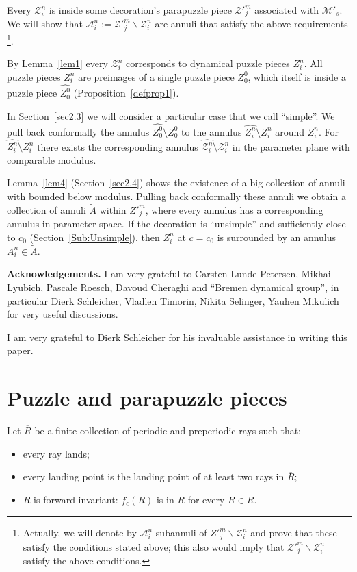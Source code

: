 \documentclass[12pt,a4paper]{amsart}
\newcommand{\MM}{\mathcal M}
\renewcommand{\AA}{\mathcal A}
\newcommand{\ZZ}{\mathcal Z}
\newcommand{\ovl}{\overline}
\begin{document}
  Every $\ZZ^n_i$ is inside some decoration's
  parapuzzle piece $\ZZ'^m_j$ associated with $\MM'_s$.
  We will show that
  $\AA^n_i:=\ZZ'^m_j\backslash \ZZ^n_i$ are annuli that satisfy the
above requirements%
\footnote{Actually, we will denote by $\AA^n_i$ subannuli of
$Z'^m_j\backslash \ZZ^n_i$ and prove that these satisfy the
conditions stated above; this also would imply that
$\ZZ'^m_j\backslash \ZZ^n_i$ satisfy the above conditions.}.


  By Lemma~\ref{lem1} every $\ZZ^n_i$ corresponds to
   dynamical puzzle pieces $Z^n_i$.
   All puzzle pieces $Z^n_i$ are preimages of a single puzzle piece
 $Z^0_0$, which itself is inside a puzzle piece $\widehat{Z^0_0}$ (Proposition~\ref{defprop1}).

In Section~\ref{sec2.3} we will consider a particular case that we
call ``simple''. We pull back conformally the annulus
$\widehat{Z^0_0}\setminus Z^0_0$ to the annulus
$\widehat{Z^n_i}\setminus Z^n_i$ around $Z^n_i$. For
$\widehat{Z^n_i}\setminus Z^n_i$ there exists the corresponding
annulus $\widehat{\ZZ^n_i}\setminus \ZZ^n_i$ in the parameter plane
with comparable modulus.

    Lemma~\ref{lem4} (Section~\ref{sec2.4}) shows the existence of a
    big collection of annuli with  bounded below modulus. Pulling
    back
    conformally these annuli we obtain a collection of annuli $\widetilde{A}$ within
    $Z'^m_j$, where every annulus has a corresponding annulus in parameter space.
     If the decoration is ``unsimple'' and sufficiently close to $c_0$ (Section~\ref{Sub:Unsimple}), then $Z^n_i$ at $c=c_0$ is
    surrounded by an annulus $A^n_i\in \widetilde{A}$.




\medskip\noindent\textbf{Acknowledgements.} I am very grateful to
 Carsten Lunde Petersen, Mikhail Lyubich, Pascale
Roesch, Davoud Cheraghi and ``Bremen dynamical group'', in
particular Dierk Schleicher, Vladlen Timorin, Nikita Selinger,
Yauhen Mikulich for very useful discussions.

I am very grateful to Dierk Schleicher for his invaluable assistance
in writing this paper.

\newpage


\section{Puzzle and parapuzzle pieces}
\label{sec1}


Let $\ovl R$ be a finite collection of periodic and preperiodic
rays such that:
\begin{itemize}
\item every ray lands;

\item every landing point is the landing point of at least two
rays in $\ovl R$;

\item $\ovl{R}$ is forward invariant: $f_c(R)$ is in $\ovl
R$ for every $R\in \ovl R$.
\end{itemize}
\end{document}
